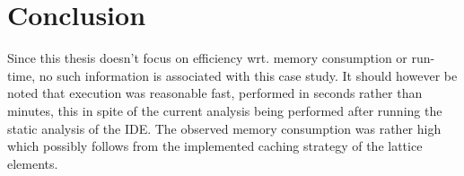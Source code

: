\section{Conclusion}

Since this thesis doesn't focus on efficiency wrt. memory consumption or run-time, no such information is associated with this case study. It should however be noted that execution was reasonable fast, performed in seconds rather than minutes, this in spite of the current analysis being performed after running the static analysis of the IDE. The observed memory consumption was rather high which possibly follows from the implemented caching strategy of the lattice elements.  